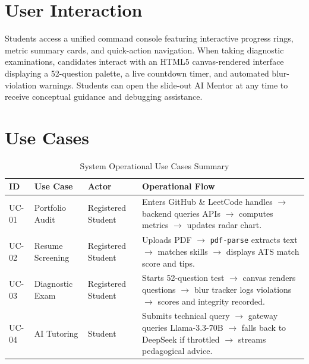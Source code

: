 \section{User Interaction}
Students access a unified command console featuring interactive progress rings, metric summary cards, and quick-action navigation. When taking diagnostic examinations, candidates interact with an HTML5 canvas-rendered interface displaying a 52-question palette, a live countdown timer, and automated blur-violation warnings. Students can open the slide-out AI Mentor at any time to receive conceptual guidance and debugging assistance.

\section{Use Cases}
\begin{table}[htbp]
\centering
\scriptsize
\caption{System Operational Use Cases Summary}
\label{tab:use_cases}
\begin{tabularx}{\textwidth}{l p{2.2cm} p{2.5cm} X}
\toprule
\textbf{ID} & \textbf{Use Case} & \textbf{Actor} & \textbf{Operational Flow} \\
\midrule
UC-01 & Portfolio Audit & Registered Student & Enters GitHub \& LeetCode handles $\rightarrow$ backend queries APIs $\rightarrow$ computes metrics $\rightarrow$ updates radar chart. \\
\addlinespace
UC-02 & Resume Screening & Registered Student & Uploads PDF $\rightarrow$ \texttt{pdf-parse} extracts text $\rightarrow$ matches skills $\rightarrow$ displays ATS match score and tips. \\
\addlinespace
UC-03 & Diagnostic Exam & Registered Student & Starts 52-question test $\rightarrow$ canvas renders questions $\rightarrow$ blur tracker logs violations $\rightarrow$ scores and integrity recorded. \\
\addlinespace
UC-04 & AI Tutoring & Student & Submits technical query $\rightarrow$ gateway queries Llama-3.3-70B $\rightarrow$ falls back to DeepSeek if throttled $\rightarrow$ streams pedagogical advice. \\
\bottomrule
\end{tabularx}
\end{table}
